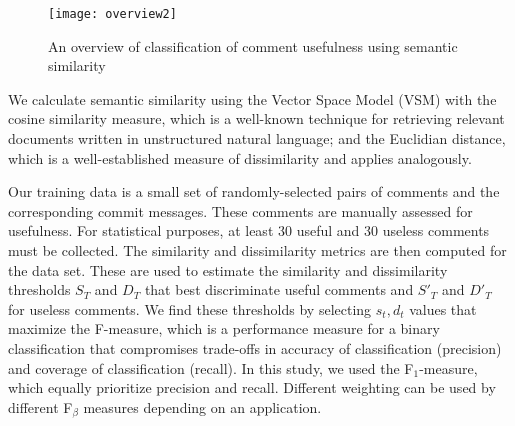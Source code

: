 \begin{figure}[!t]
\centering
\texttt{[image: overview2]}
\caption{An overview of classification of comment usefulness using semantic similarity}
\label{fig:overview}
\end{figure}

We calculate semantic similarity using the Vector Space Model (VSM) with the cosine similarity measure, which is a well-known technique for retrieving relevant documents written in unstructured natural language\cite{did}; and the Euclidian distance, which is a well-established measure of dissimilarity and applies analogously\cite{dfdf}.

Our training data is a small set of randomly-selected pairs of comments and the corresponding commit messages.
These comments are manually assessed for usefulness.
For statistical purposes, at least 30 useful and 30 useless comments must be collected.
The similarity and dissimilarity metrics are then computed for the data set.
These are used to estimate the similarity and dissimilarity thresholds $S_T$ and $D_T$ that best discriminate useful comments and $S'_T$ and $D'_T$ for useless comments. 
We find these thresholds by selecting $s_t,d_t$ values that maximize the F-measure,
which is a performance measure for a binary classification that compromises trade-offs in accuracy of classification (precision) and coverage of classification (recall).
In this study, we used the F$_1$-measure, which equally prioritize precision and recall.
Different weighting can be used by different F$_\beta$ measures depending on an application.


